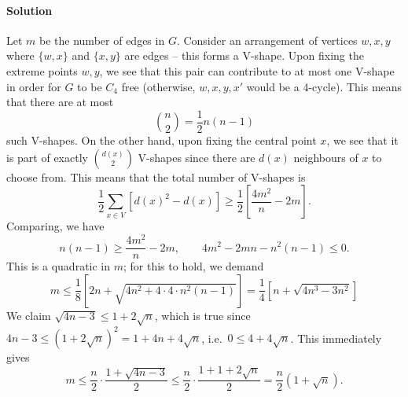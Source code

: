 \documentclass[10pt]{article}
\newcommand{\solution}{\paragraph{Solution}}
\begin{document}
    \solution Let $m$ be the number of edges in $G$. Consider an arrangement of
    vertices $w, x, y$ where $\{w, x\}$ and $\{x, y\}$ are edges -- this forms a
    V-shape. Upon fixing the extreme points $w, y$, we see that this pair can
    contribute to at most one V-shape in order for $G$ to be $C_4$ free (otherwise,
    $w, x, y, x'$ would be a 4-cycle). This means that there are at most \[
        \binom{n}{2} = \frac{1}{2}n(n - 1)
    \] such V-shapes. On the other hand, upon fixing the central point $x$, we see
    that it is part of exactly $\binom{d(x)}{2}$ V-shapes since there are $d(x)$
    neighbours of $x$ to choose from. This means that the total number of V-shapes
    is \[
        \frac{1}{2}\sum_{x \in V} [d(x)^2 - d(x)] \geq
        \frac{1}{2}\left[\frac{4m^2}{n} - 2m\right].
    \] Comparing, we have \[
        n(n - 1) \geq \frac{4m^2}{n} - 2m, \qquad 4m^2 - 2mn - n^2(n - 1) \leq 0.
    \] This is a quadratic in $m$; for this to hold, we demand \[
        m \leq \frac{1}{8}[2n + \sqrt{4n^2 + 4\cdot 4\cdot n^2(n - 1)}] =
        \frac{1}{4}[n + \sqrt{4n^3 - 3n^2}]
    \] We claim $\sqrt{4n - 3} \leq 1 + 2\sqrt{n}$, which is true since $4n - 3 \leq
    (1 + 2\sqrt{n})^2 = 1 + 4n + 4\sqrt{n}$, i.e.\ $0 \leq 4 + 4\sqrt{n}$. This
    immediately gives \[
        m \leq \frac{n}{2}\cdot \frac{1 + \sqrt{4n - 3}}{2} \leq \frac{n}{2}\cdot
        \frac{1 + 1 + 2\sqrt{n}}{2} = \frac{n}{2}(1 + \sqrt{n}).
    \] 
    
\end{document}
